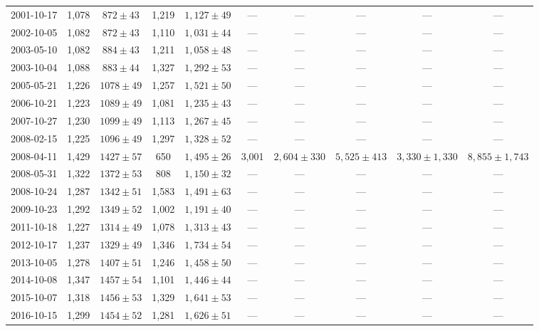 \begin{landscape}
\begin{longtable}{cccccccccc}
{2001-10-17} & 1,078 & {$872  \pm  43$} & 1,219 & {$1,127 \pm 49$} & --- & --- & --- & --- & --- \\
{2002-10-05} & 1,082 & {$872  \pm  43$} & 1,110 & {$1,031 \pm 44$} & --- & --- & --- & --- & --- \\
{2003-05-10} & 1,082 & {$884  \pm  43$} & 1,211 & {$1,058 \pm 48$} & --- & --- & --- & --- & --- \\
{2003-10-04} & 1,088 & {$883  \pm  44$} & 1,327 & {$1,292 \pm 53$} & --- & --- & --- & --- & --- \\
{2005-05-21} & 1,226 & {$1078  \pm  49$} & 1,257 & {$1,521 \pm 50$} & --- & --- & --- & --- & --- \\
{2006-10-21} & 1,223 & {$1089  \pm  49$} & 1,081 & {$1,235 \pm 43$} & --- & --- & --- & --- & --- \\
{2007-10-27} & 1,230 & {$1099  \pm  49$} & 1,113 & {$1,267 \pm 45$} & --- & --- & --- & --- & --- \\
{2008-02-15} & 1,225 & {$1096  \pm  49$} & 1,297 & {$1,328 \pm 52$} & --- & --- & --- & --- & --- \\
{2008-04-11} & 1,429 & {$1427  \pm  57$} & 650 & {$1,495 \pm 26$} & 3,001 & {$2,604 \pm 330$} & {$5,525 \pm 413$} & {$3,330 \pm 1,330$} & {$8,855 \pm 1,743$} \\
{2008-05-31} & 1,322 & {$1372  \pm  53$} & 808 & {$1,150 \pm 32$} & --- & --- & --- & --- & --- \\
{2008-10-24} & 1,287 & {$1342  \pm  51$} & 1,583 & {$1,491 \pm 63$} & --- & --- & --- & --- & --- \\
{2009-10-23} & 1,292 & {$1349  \pm  52$} & 1,002 & {$1,191 \pm 40$} & --- & --- & --- & --- & --- \\
{2011-10-18} & 1,227 & {$1314  \pm  49$} & 1,078 & {$1,313 \pm 43$} & --- & --- & --- & --- & --- \\
{2012-10-17} & 1,237 & {$1329  \pm  49$} & 1,346 & {$1,734 \pm 54$} & --- & --- & --- & --- & --- \\
{2013-10-05} & 1,278 & {$1407  \pm  51$} & 1,246 & {$1,458 \pm 50$} & --- & --- & --- & --- & --- \\
{2014-10-08} & 1,347 & {$1457  \pm  54$} & 1,101 & {$1,446 \pm 44$} & --- & --- & --- & --- & --- \\
{2015-10-07} & 1,318 & {$1456  \pm  53$} & 1,329 & {$1,641 \pm 53$} & --- & --- & --- & --- & --- \\
{2016-10-15} & 1,299 & {$1454  \pm  52$} & 1,281 & {$1,626 \pm 51$} & --- & --- & --- & --- & --- \\
\end{longtable} 
\end{landscape} 
